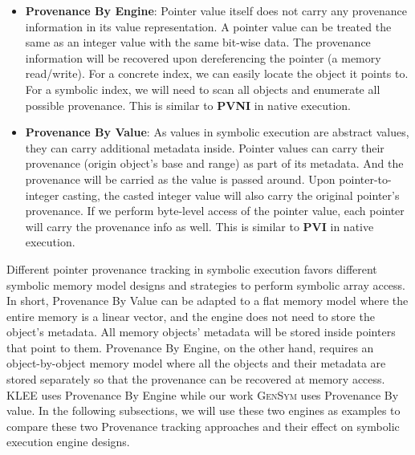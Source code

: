 \documentclass[sigplan, nonacm]{acmart}\settopmatter{printfolios=true,printccs=false,printacmref=false}
\newcommand{\tool}{\textsc{GenSym}\xspace}
\newcommand{\klee}{\textsc{KLEE}\xspace}
\begin{document}
  \begin{itemize}
    \item \textbf{Provenance By Engine}: Pointer value itself does not carry any provenance information in its value representation. A pointer value can be treated the same as an integer value with the same bit-wise data. The provenance information will be recovered upon dereferencing the pointer (a memory read/write). For a concrete index, we can easily locate the object it points to. For a symbolic index, we will need to scan all objects and enumerate all possible provenance. This is similar to \textbf{PVNI} in native execution.
    \item \textbf{Provenance By Value}: As values in symbolic execution are abstract values, they can carry additional metadata inside. Pointer values can carry their provenance (origin object's base and range) as part of its metadata. And the provenance will be carried as the value is passed around. Upon pointer-to-integer casting, the casted integer value will also carry the original pointer's provenance. If we perform byte-level access of the pointer value, each pointer will carry the provenance info as well. This is similar to \textbf{PVI} in native execution.
  \end{itemize}
  Different pointer provenance tracking in symbolic execution favors different symbolic memory model designs and strategies to perform symbolic array access. In short, Provenance By Value can be adapted to a flat memory model where the entire memory is a linear vector, and the engine does not need to store the object's metadata. All memory objects' metadata will be stored inside pointers that point to them.  Provenance By Engine, on the other hand, requires an object-by-object memory model where all the objects and their metadata are stored separately so that the provenance can be recovered at memory access. \klee uses Provenance By Engine while our work \tool uses Provenance By value. In the following subsections, we will use these two engines as examples to compare these two Provenance tracking approaches and their effect on symbolic execution engine designs.
\end{document}
